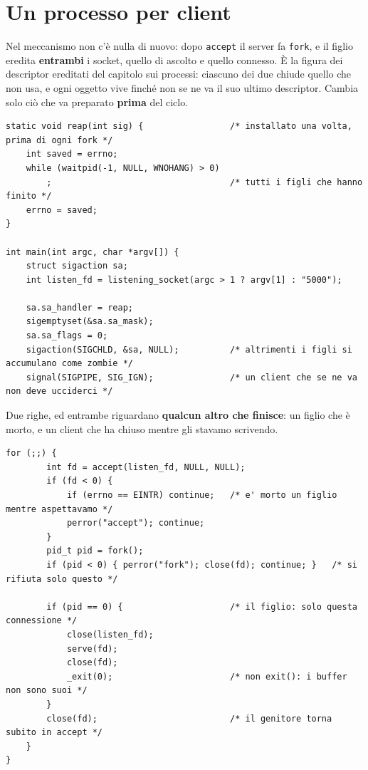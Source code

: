 \section{Un processo per client}

Nel meccanismo non c'è nulla di nuovo: dopo \texttt{accept} il server fa \texttt{fork}, e il figlio eredita
\textbf{entrambi} i socket, quello di ascolto e quello connesso. È la figura dei descriptor ereditati del capitolo sui
processi: ciascuno dei due chiude quello che non usa, e ogni oggetto vive finché non se ne va il suo ultimo descriptor.
Cambia solo ciò che va preparato \textbf{prima} del ciclo.

\begin{lstlisting}[language={[POSIX]C}, style=wnumbers, title={Il server concorrente: che cosa cambia prima del ciclo}]
static void reap(int sig) {                 /* installato una volta, prima di ogni fork */
    int saved = errno;
    while (waitpid(-1, NULL, WNOHANG) > 0)
        ;                                   /* tutti i figli che hanno finito */
    errno = saved;
}

int main(int argc, char *argv[]) {
    struct sigaction sa;
    int listen_fd = listening_socket(argc > 1 ? argv[1] : "5000");

    sa.sa_handler = reap;
    sigemptyset(&sa.sa_mask);
    sa.sa_flags = 0;
    sigaction(SIGCHLD, &sa, NULL);          /* altrimenti i figli si accumulano come zombie */
    signal(SIGPIPE, SIG_IGN);               /* un client che se ne va non deve ucciderci */
\end{lstlisting}

Due righe, ed entrambe riguardano \textbf{qualcun altro che finisce}: un figlio che è morto, e un client che ha chiuso
mentre gli stavamo scrivendo.

\begin{lstlisting}[language={[POSIX]C}, style=wnumbers, title={Il ciclo di accept che fa fork}]
    for (;;) {
        int fd = accept(listen_fd, NULL, NULL);
        if (fd < 0) {
            if (errno == EINTR) continue;   /* e' morto un figlio mentre aspettavamo */
            perror("accept"); continue;
        }
        pid_t pid = fork();
        if (pid < 0) { perror("fork"); close(fd); continue; }   /* si rifiuta solo questo */

        if (pid == 0) {                     /* il figlio: solo questa connessione */
            close(listen_fd);
            serve(fd);
            close(fd);
            _exit(0);                       /* non exit(): i buffer non sono suoi */
        }
        close(fd);                          /* il genitore torna subito in accept */
    }
}
\end{lstlisting}

